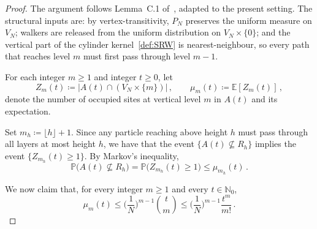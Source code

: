 \documentclass[11pt,a4paper,reqno]{amsart}
\theoremstyle{definition}
\newcommand{\bbE}{{\ensuremath{\mathbb E}} }
\newcommand{\bbN}{{\ensuremath{\mathbb N}} }
\newcommand{\bbP}{{\ensuremath{\mathbb P}} }
\let\m=\mu   \let\n=\nu   \let\o=\omega    \let\p=\pi  \let\ph=\varphi
\begin{document}
\begin{proof}
The argument follows Lemma~C.1 of~\cite{levine2018long}, adapted to the present setting. The structural inputs are: by vertex-transitivity, $P_N$ preserves the uniform measure on $V_N$; walkers are released from the uniform distribution on $V_N \times \{0\}$; and the vertical part of the cylinder kernel~\eqref{def:SRW} is nearest-neighbour, so every path that reaches level $m$ must first pass through level $m-1$.

For each integer $m \geq 1$ and integer $t \geq 0$, let
	\[ Z_m(t) \coloneqq |A(t) \cap (V_N \times \{m\})|\,, \qquad \m_m(t) \coloneqq \bbE[Z_m(t)]\,, \]
denote the number of occupied sites at vertical level $m$ in $A(t)$ and its expectation. 

Set $m_h \coloneqq \lfloor h \rfloor + 1$. Since any particle reaching above height $h$ must pass through all layers at most height $h$, we have that
the event $\{ A(t)  \nsubseteq R_h \}$ implies the event $\{Z_{m_h}(t) \geq 1 \}$.
By Markov's inequality,
	\begin{equation}\label{eq:height-bound}
	 \bbP\!\big( A(t) \nsubseteq R_h \big) = \bbP\!\big( Z_{m_h}(t) \geq 1 \big) \leq \m_{m_h}(t)\,.
	\end{equation}


We now claim that, for every integer $m \geq 1$ and every $t \in \bbN_0$,
	\begin{equation}\label{LBG_up}
	 \m_m(t) \leq \Big( \frac{1}{N} \Big)^{m-1} \binom{t}{m} \leq \Big( \frac{1}{N} \Big)^{m-1}\frac{t^m}{m!}\,.
	\end{equation}


\end{proof}
\end{document}
